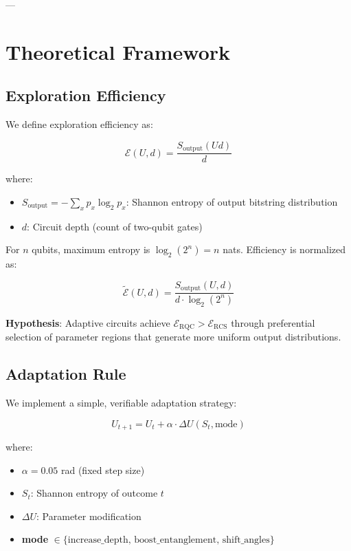 \documentclass[twocolumn]{article}
\begin{document}
---

\section{Theoretical Framework}

\subsection{Exploration Efficiency}

We define exploration efficiency as:

\begin{equation}
\mathcal{E}(U, d) = \frac{S_{\text{output}}(U d)}{d}
\end{equation}

where:
\begin{itemize}
\item $S_{\text{output}} = -\sum_x p_x \log_2 p_x$: Shannon entropy of output bitstring distribution
\item $d$: Circuit depth (count of two-qubit gates)
\end{itemize}

For $n$ qubits, maximum entropy is $\log_2(2^n) = n$ nats. Efficiency is normalized as:

\begin{equation}
\tilde{\mathcal{E}}(U, d) = \frac{S_{\text{output}}(U, d)}{d \cdot \log_2(2^n)}
\end{equation}

\textbf{Hypothesis}: Adaptive circuits achieve $\mathcal{E}_{\text{RQC}} > \mathcal{E}_{\text{RCS}}$ through preferential selection of parameter regions that generate more uniform output distributions.

\subsection{Adaptation Rule}

We implement a simple, verifiable adaptation strategy:

\begin{equation}
U_{t+1} = U_t + \alpha \cdot \Delta U(S_t, \text{mode})
\end{equation}

where:
\begin{itemize}
\item $\alpha = 0.05$ rad (fixed step size)
\item $S_t$: Shannon entropy of outcome $t$
\item $\Delta U$: Parameter modification
\item \textbf{mode} $\in \{\text{increase\_depth, boost\_entanglement, shift\_angles}\}$
\end{itemize}
\end{document}

